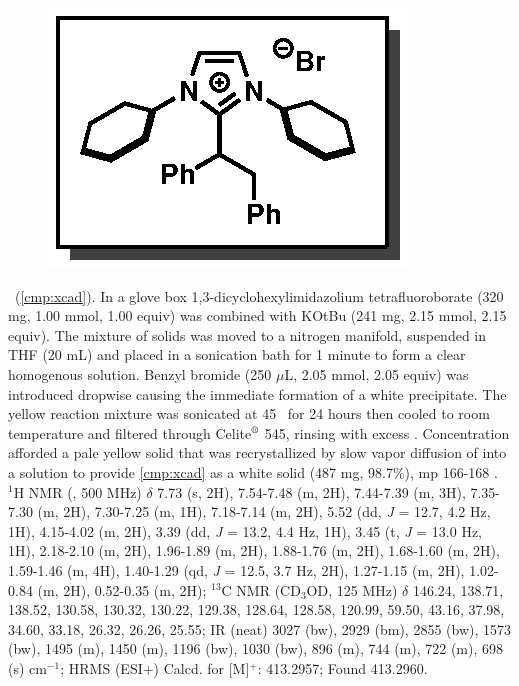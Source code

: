 \pagebreak
\begin{figure}
  \vspace{-12pt}
  \begin{center}
    \includegraphics[scale=0.8]{chp_alkylation/images/xcad}
  \end{center}
  \vspace{-25pt}
\end{figure}
\noindent \textbf{\CMPxcad}\ (\ref{cmp:xcad}). In a glove box 1,3-dicyclohexylimidazolium
tetrafluoroborate (320 mg, 1.00 mmol, 1.00 equiv) was combined with KOtBu (241 mg, 2.15 mmol, 2.15
equiv). The mixture of solids was moved to a nitrogen manifold, suspended in THF (20 mL) and placed
in a sonication bath for 1 minute to form a clear homogenous solution.
Benzyl bromide (250 $\mu$L, 2.05 mmol, 2.05 equiv) was introduced dropwise causing the immediate
formation of a white precipitate. The yellow reaction mixture was sonicated at 45 \degc\ for 24
hours then cooled to room temperature and filtered through
Celite$\textsuperscript{\textregistered}$ 545, rinsing with excess . Concentration
afforded a pale yellow solid that was recrystallized by slow vapor diffusion of  into a
 solution to provide \ref{cmp:xcad} as a white solid (487 mg, 98.7\%), mp 166-168 \degc.
\\
$^1$H NMR (, 500 MHz) $\delta$ 7.73 (s, 2H), 7.54-7.48 (m, 2H), 7.44-7.39 (m, 3H),
7.35-7.30 (m, 2H), 7.30-7.25 (m, 1H), 7.18-7.14 (m, 2H), 5.52 (dd, \textit{J} = 12.7, 4.2 Hz, 1H),
4.15-4.02 (m, 2H), 3.39 (dd, \textit{J} = 13.2, 4.4 Hz, 1H), 3.45 (t, \textit{J} = 13.0 Hz,
1H), 2.18-2.10 (m, 2H), 1.96-1.89 (m, 2H), 1.88-1.76 (m, 2H), 1.68-1.60 (m, 2H), 1.59-1.46 (m, 4H),
1.40-1.29 (qd, \textit{J} = 12.5, 3.7 Hz, 2H), 1.27-1.15 (m, 2H), 1.02-0.84 (m,
2H), 0.52-0.35 (m, 2H); $^{13}$C NMR (CD$_3$OD, 125 MHz) $\delta$ 146.24, 138.71, 138.52, 130.58, 130.32, 130.22, 129.38, 128.64, 128.58, 120.99, 59.50, 43.16, 37.98, 34.60, 33.18, 26.32, 26.26, 25.55; IR (neat) 3027 (bw), 2929 (bm), 2855 (bw), 1573 (bw), 1495 (m), 1450 (m), 1196 (bw), 1030 (bw), 896 (m), 744 (m), 722 (m), 698 (s) cm$^{-1}$; HRMS (ESI+) Calcd.
for  [M]$^+$:
413.2957; Found 413.2960.

